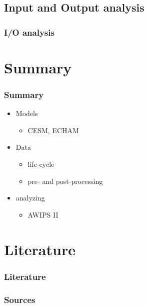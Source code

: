 \documentclass[compress]{beamer}
\begin{document}
\subsection{Input and Output analysis}
\begin{frame}[fragile]
	\frametitle{I/O analysis}


\end{frame}




\section{Summary}

\begin{frame}
	\frametitle{Summary}

	\begin{itemize}
		\item Models
		\begin{itemize}
			\item CESM, ECHAM
		\end{itemize}

		\item Data
		\begin{itemize}
			\item life-cycle
			\item pre- and post-processing
		\end{itemize}
		\item analyzing
		\begin{itemize}
		    \item AWIPS II
		\end{itemize}
	\end{itemize}
\end{frame}

\section*{Literature}

\begin{frame}[allowframebreaks]
	\frametitle{Literature}
    \frametitle{Sources}

	
	
\end{frame}
\end{document}
